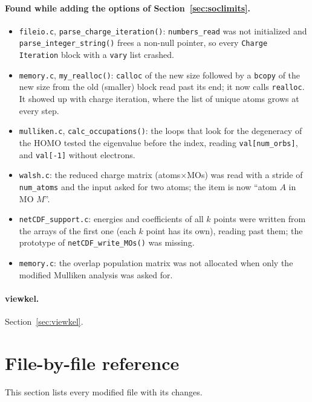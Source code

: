 \documentclass[11pt,a4paper]{article}
\newcommand{\file}[1]{\texttt{#1}}
\newcommand{\fn}[1]{\texttt{#1()}}
\newcommand{\var}[1]{\texttt{#1}}
\begin{document}
\paragraph{Found while adding the options of Section~\ref{sec:soclimits}.}
\begin{itemize}
\item \file{fileio.c}, \fn{parse\_charge\_iteration}: \var{numbers\_read} was not
  initialized and \fn{parse\_integer\_string} frees a non-null pointer, so every
  \texttt{Charge Iteration} block with a \texttt{vary} list crashed.
\item \file{memory.c}, \fn{my\_realloc}: \texttt{calloc} of the new size followed by a
  \texttt{bcopy} of the new size from the old (smaller) block read past its end; it now
  calls \texttt{realloc}. It showed up with charge iteration, where the list of unique atoms
  grows at every step.
\item \file{mulliken.c}, \fn{calc\_occupations}: the loops that look for the degeneracy of
  the HOMO tested the eigenvalue before the index, reading \texttt{val[num\_orbs]}, and
  \texttt{val[-1]} without electrons.
\item \file{walsh.c}: the reduced charge matrix (atoms$\times$MOs) was read with a stride of
  \var{num\_atoms} and the input asked for two atoms; the item is now ``atom $A$ in MO $M$''.
\item \file{netCDF\_support.c}: energies and coefficients of all $k$ points were written
  from the arrays of the first one (each $k$ point has its own), reading past them; the
  prototype of \fn{netCDF\_write\_MOs} was missing.
\item \file{memory.c}: the overlap population matrix was not allocated when only the
  modified Mulliken analysis was asked for.
\end{itemize}

\paragraph{viewkel.} Section~\ref{sec:viewkel}.

\section{File-by-file reference}

This section lists every modified file with its changes.
\end{document}
